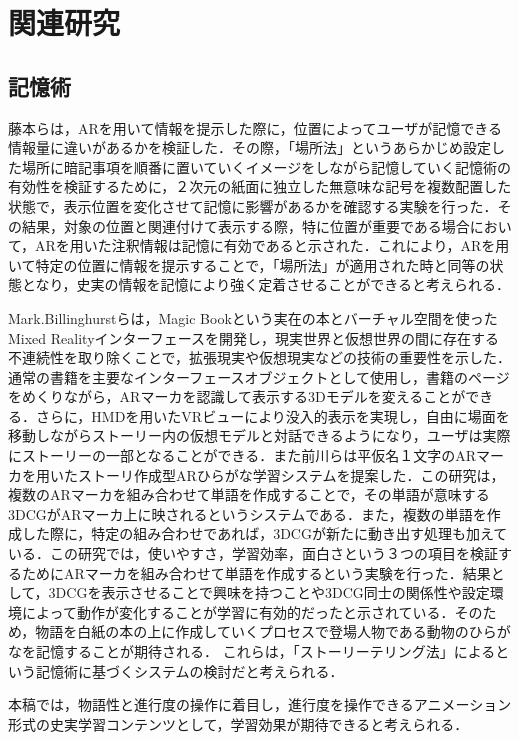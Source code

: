 \documentclass[a4paper,dvipdfmx]{hisken}
\begin{document}
\section{関連研究}
\subsection{記憶術}

藤本ら\cite{hujimoto}は，ARを用いて情報を提示した際に，位置によってユーザが記憶できる情報量に違いがあるかを検証した．その際，「場所法」\cite{brien}というあらかじめ設定した場所に暗記事項を順番に置いていくイメージをしながら記憶していく記憶術の有効性を検証するために，２次元の紙面に独立した無意味な記号を複数配置した状態で，表示位置を変化させて記憶に影響があるかを確認する実験を行った．その結果，対象の位置と関連付けて表示する際，特に位置が重要である場合において，ARを用いた注釈情報は記憶に有効であると示された．これにより，ARを用いて特定の位置に情報を提示することで，「場所法」が適用された時と同等の状態となり，史実の情報を記憶により強く定着させることができると考えられる．

Mark.Billinghurst\cite{magic}らは，Magic Bookという実在の本とバーチャル空間を使ったMixed Realityインターフェースを開発し，現実世界と仮想世界の間に存在する不連続性を取り除くことで，拡張現実や仮想現実などの技術の重要性を示した．通常の書籍を主要なインターフェースオブジェクトとして使用し，書籍のページをめくりながら，ARマーカを認識して表示する3Dモデルを変えることができる．さらに，HMDを用いたVRビューにより没入的表示を実現し，自由に場面を移動しながらストーリー内の仮想モデルと対話できるようになり，ユーザは実際にストーリーの一部となることができる．また前川ら\cite{maekawa}は平仮名１文字のARマーカを用いたストーリ作成型ARひらがな学習システムを提案した．この研究は，複数のARマーカを組み合わせて単語を作成することで，その単語が意味する3DCGがARマーカ上に映されるというシステムである．また，複数の単語を作成した際に，特定の組み合わせであれば，3DCGが新たに動き出す処理も加えている．この研究では，使いやすさ，学習効率，面白さという３つの項目を検証するためにARマーカを組み合わせて単語を作成するという実験を行った．結果として，3DCGを表示させることで興味を持つことや3DCG同士の関係性や設定環境によって動作が変化することが学習に有効的だったと示されている．そのため，物語を白紙の本の上に作成していくプロセスで登場人物である動物のひらがなを記憶することが期待される．
これらは，「ストーリーテリング法」によるという記憶術\cite{oaks}に基づくシステムの検討だと考えられる．

本稿では，物語性と進行度の操作に着目し，進行度を操作できるアニメーション形式の史実学習コンテンツとして，学習効果が期待できると考えられる．
\end{document}
